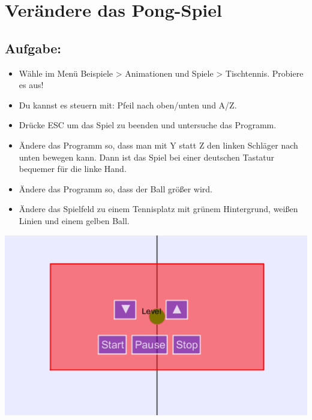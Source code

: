 \chapter{Verändere das Pong-Spiel}
\begin{multicols}{2}
\section*{\color{BrickRed}Aufgabe:}


\begin{itemize}

\item {Wähle im Menü Beispiele > Animationen und Spiele > Tischtennis. Probiere es aus!}
\item {Du kannst es steuern mit: Pfeil nach oben/unten und A/Z.}
\item {Drücke ESC um das Spiel zu beenden und untersuche das Programm.}
\item {Ändere das Programm so, dass man mit Y statt Z den linken Schläger nach unten bewegen kann. Dann ist das Spiel bei einer deutschen Tastatur bequemer für die linke Hand.}
\item {Ändere das Programm so, dass der Ball größer wird.}
\item {Ändere das Spielfeld zu einem Tennisplatz mit grünem Hintergrund, weißen Linien und einem gelben Ball.}

\end{itemize}



\columnbreak

\begin{center}
\includegraphics{../img/pong.png}
\end{center}

\end{multicols}

